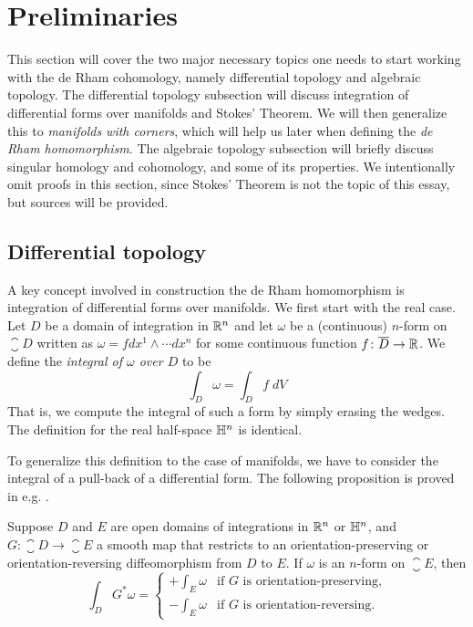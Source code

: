 \documentclass[a4paper, 12pt]{article}
\begin{document}
\section{Preliminaries}

This section will cover the two major necessary topics one needs to start
working with the de Rham cohomology, namely differential topology and algebraic
topology. The differential topology subsection will discuss integration of
differential forms over manifolds and Stokes' Theorem.  We will then generalize
this to \emph{manifolds with corners}, which will help us later when defining
the \emph{de Rham homomorphism}.  The algebraic topology subsection will briefly
discuss singular homology and cohomology, and some of its properties.  We
intentionally omit proofs in this section, since Stokes' Theorem is not the
topic of this essay, but sources will be provided.

\subsection{Differential topology}

A key concept involved in construction the de Rham homomorphism is integration of differential forms over manifolds.
We first start with the real case.
Let $D$ be a domain of integration in $\mathbb{R}^n$ and let $\omega$ be a (continuous) $n$-form on $\closure{D}$ written as
$\omega = f dx^1\wedge\cdots dx^n$ for some continuous function $f \colon \overline{D} \to \mathbb{R}$.
We define the \emph{integral of $\omega$ over $D$} to be
\[
    \int_{D} \omega = \int_{D} f \; dV
\]
That is, we compute the integral of such a form by simply erasing the wedges.
The definition for the real half-space $\mathbb{H}^n$ is identical.

To generalize this definition to the case of manifolds, we have to consider the integral of a pull-back of a differential form.
The following proposition is proved in e.g. \cite[Prop. 16.1]{Lee2012}.

Suppose $D$ and $E$ are open domains of integrations in $\mathbb{R}^n$ or $\mathbb{H}^n$,
and $G \colon \closure{D} \to \closure{E}$ a smooth map that restricts to an orientation-preserving or orientation-reversing diffeomorphism from $D$ to $E$.
If $\omega$ is an $n$-form on $\closure{E}$, then
\[
    \int_{D} G^*\omega =
    \begin{cases}
        + \int_{E} \omega &\text{if $G$ is orientation-preserving,} \\
        - \int_{E} \omega &\text{if $G$ is orientation-reversing.}
    \end{cases}
\]
\end{document}
